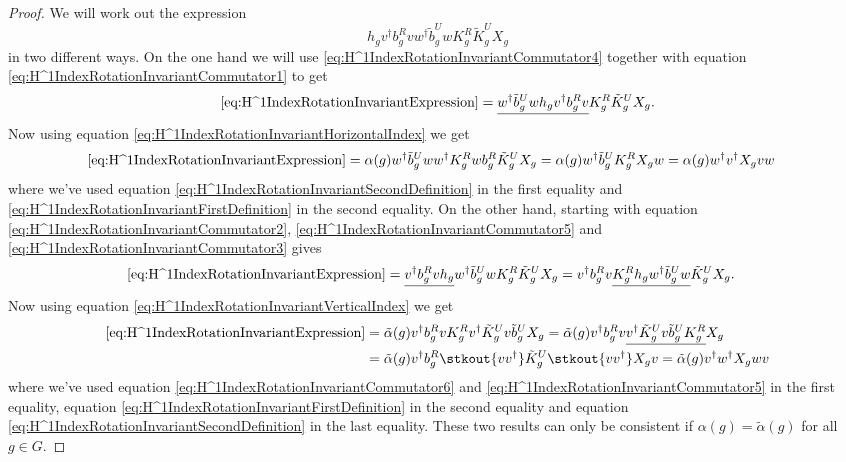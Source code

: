 \begin{proof}
	We will work out the expression
	\begin{equation}\label{eq:H^1IndexRotationInvariantExpression}
		h_g v^\dagger b_g^R v w^\dagger\tilde{b}_g^U w K_g^R\tilde{K}_g^U X_g
	\end{equation}
	in two different ways. On the one hand we will use \eqref{eq:H^1IndexRotationInvariantCommutator4} together with equation \eqref{eq:H^1IndexRotationInvariantCommutator1} to get
	\begin{equation}
		\eqref{eq:H^1IndexRotationInvariantExpression}= \underline{w^\dagger\tilde{b}_g^U w h_g v^\dagger b_g^R v} K_g^R\tilde{K}_g^U X_g.
	\end{equation}
	Now using equation \eqref{eq:H^1IndexRotationInvariantHorizontalIndex} we get
	\begin{align}
		\eqref{eq:H^1IndexRotationInvariantExpression}&=\alpha(g)w^\dagger\tilde{b}_g^U w w^\dagger K_g^R w b_g^R\tilde{K}_g^U X_g=\alpha(g)w^\dagger\tilde{b}_g^U  K_g^R X_g w=\alpha(g)w^\dagger v^\dagger X_g v w
	\end{align}
	where we've used equation \eqref{eq:H^1IndexRotationInvariantSecondDefinition} in the first equality and \eqref{eq:H^1IndexRotationInvariantFirstDefinition} in the second equality. On the other hand, starting with equation \eqref{eq:H^1IndexRotationInvariantCommutator2}, \eqref{eq:H^1IndexRotationInvariantCommutator5} and \eqref{eq:H^1IndexRotationInvariantCommutator3} gives
	\begin{align}
		\eqref{eq:H^1IndexRotationInvariantExpression}&= \underline{v^\dagger b_g^R v h_g} w^\dagger\tilde{b}_g^U w K_g^R\tilde{K}_g^U X_g =v^\dagger b_g^R v \underline{K_g^R h_g w^\dagger\tilde{b}_g^U w} \tilde{K}_g^U X_g.
	\end{align}
	Now using equation \eqref{eq:H^1IndexRotationInvariantVerticalIndex} we get
	\begin{align}
		\eqref{eq:H^1IndexRotationInvariantExpression}&=\tilde{\alpha}(g)v^\dagger b_g^R v K_g^R v^\dagger \tilde{K}_g^U v \tilde{b}_g^U X_g=\tilde{\alpha}(g)v^\dagger b_g^R v \underline{v^\dagger \tilde{K}_g^U v \tilde{b}_g^U K_g^R} X_g\\
		&=\tilde{\alpha}(g)v^\dagger b_g^R \stkout{v v^\dagger} \tilde{K}_g^U \stkout{v v^\dagger} X_g v=\tilde{\alpha}(g) v^\dagger w^\dagger X_g w v
	\end{align}
	where we've used equation \eqref{eq:H^1IndexRotationInvariantCommutator6} and \eqref{eq:H^1IndexRotationInvariantCommutator5} in the first equality, equation \eqref{eq:H^1IndexRotationInvariantFirstDefinition} in the second equality and equation \eqref{eq:H^1IndexRotationInvariantSecondDefinition} in the last equality. These two results can only be consistent if $\alpha(g)=\tilde{\alpha}(g)$ for all $g\in G$.
\end{proof}
